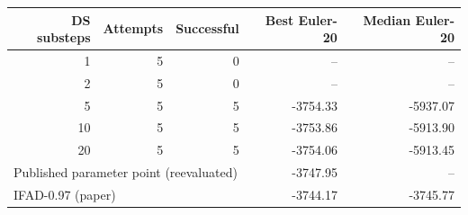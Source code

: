 \begin{tabular}{rrrrr}
\toprule
DS substeps & Attempts & Successful & Best Euler-20 & Median Euler-20 \\
\midrule
1 & 5 & 0 & -- & -- \\
2 & 5 & 0 & -- & -- \\
5 & 5 & 5 & -3754.33 & -5937.07 \\
10 & 5 & 5 & -3753.86 & -5913.90 \\
20 & 5 & 5 & -3754.06 & -5913.45 \\
\midrule
\multicolumn{3}{l}{Published parameter point (reevaluated)} & -3747.95 & -- \\
\multicolumn{3}{l}{IFAD-0.97 (paper)} & -3744.17 & -3745.77 \\
\bottomrule
\end{tabular}
